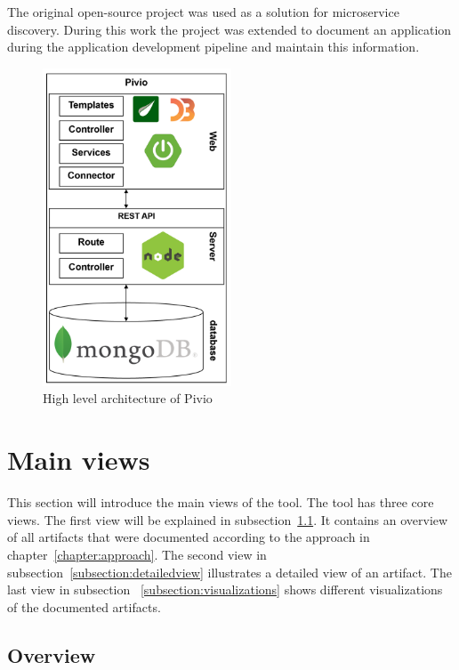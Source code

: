 The original open-source project was used as a solution for microservice discovery. During this work the project was extended to document an application during the application development pipeline and maintain this information.

\begin{figure}[htpb]
  \centering
  \includegraphics[width=0.5\textwidth]{figures/pivio-highlevel.PNG}
  \caption{High level architecture of Pivio}
  \label{fig:pivio-highlevel}
\end{figure}


\section{Main views} 
This section will introduce the main views of the tool. The tool has three core views. The first view will be explained in subsection~\ref{subsection:overview}. It contains an overview of all artifacts that were documented according to the approach in chapter~\ref{chapter:approach}. The second view in subsection~\ref{subsection:detailedview} illustrates a detailed view of an artifact. The last view in subsection ~\ref{subsection:visualizations} shows different visualizations of the documented artifacts.

\subsection{Overview}\label{subsection:overview}

